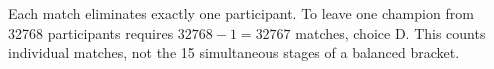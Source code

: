 Each match eliminates exactly one participant. To leave one champion from 32768 participants requires $32768-1=\boxed{32767}$ matches, choice D. This counts individual matches, not the 15 simultaneous stages of a balanced bracket.
